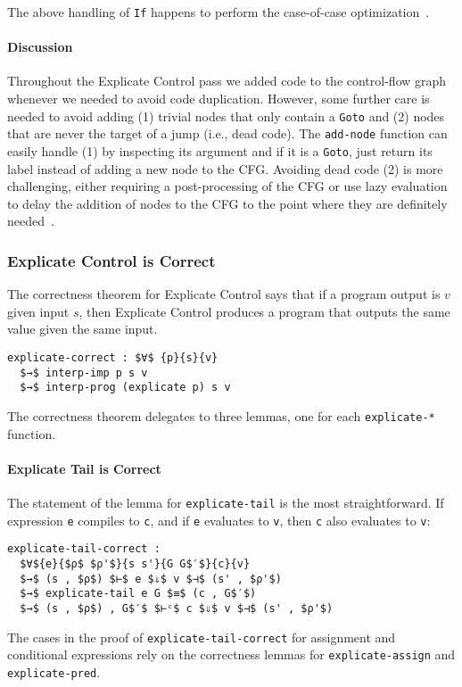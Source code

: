 \documentclass[sigplan,review,dvipsnames,screen,10pt]{acmart}
\begin{document}
\noindent The above handling of \lstinline{If} happens to perform the
case-of-case optimization~\citep{PEYTONJONES19983}.

\paragraph{Discussion}

Throughout the Explicate Control pass we added code to the
control-flow graph whenever we needed to avoid code
duplication. However, some further care is needed to avoid adding (1)
trivial nodes that only contain a \lstinline{Goto} and (2) nodes that
are never the target of a jump (i.e., dead code). The
\lstinline{add-node} function can easily handle (1) by inspecting its
argument and if it is a \lstinline{Goto}, just return its label
instead of adding a new node to the CFG.  Avoiding dead code (2) is
more challenging, either requiring a post-processing of the CFG or use
lazy evaluation to delay the addition of nodes to the CFG to the point
where they are definitely needed~\citep{Siek:2023tr}.

\subsubsection{Explicate Control is Correct}

The correctness theorem for Explicate Control says that if a program
output is $v$ given input $s$, then Explicate Control produces a
program that outputs the same value given the same input.

\begin{lstlisting}
explicate-correct : $∀$ {p}{s}{v}
  $→$ interp-imp p s v
  $→$ interp-prog (explicate p) s v
\end{lstlisting}

The correctness theorem delegates to three lemmas, one for each
\lstinline{explicate-*} function.

\paragraph{Explicate Tail is Correct}

The statement of the lemma for \lstinline{explicate-tail} is the most
straightforward. If expression \lstinline{e} compiles to
\lstinline{c}, and if \lstinline{e} evaluates to \lstinline{v}, then
\lstinline{c} also evaluates to \lstinline{v}:
\begin{lstlisting}
explicate-tail-correct :
  $∀${e}{$ρ$ $ρ'$}{s s'}{G G$′$}{c}{v}
  $→$ (s , $ρ$) $⊢$ e $⇓$ v $⊣$ (s' , $ρ'$)
  $→$ explicate-tail e G $≡$ (c , G$′$)
  $→$ (s , $ρ$) , G$′$ $⊢ᶜ$ c $⇓$ v $⊣$ (s' , $ρ'$)
\end{lstlisting}
\noindent The cases in the proof of \lstinline{explicate-tail-correct}
for assignment and conditional expressions rely on the correctness
lemmas for \lstinline{explicate-assign} and
\lstinline{explicate-pred}.
\end{document}

